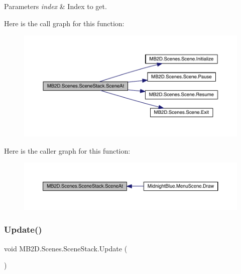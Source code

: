 \begin{DoxyParams}{Parameters}
{\em index} & Index to get.\\
\hline
\end{DoxyParams}
Here is the call graph for this function\+:\nopagebreak
\begin{figure}[H]
\begin{center}
\leavevmode
\includegraphics[width=350pt]{class_m_b2_d_1_1_scenes_1_1_scene_stack_a84b1a5b2771f6c663eece04bcafd5416_cgraph}
\end{center}
\end{figure}
Here is the caller graph for this function\+:\nopagebreak
\begin{figure}[H]
\begin{center}
\leavevmode
\includegraphics[width=350pt]{class_m_b2_d_1_1_scenes_1_1_scene_stack_a84b1a5b2771f6c663eece04bcafd5416_icgraph}
\end{center}
\end{figure}
\hypertarget{class_m_b2_d_1_1_scenes_1_1_scene_stack_a8486b29eb65458e88512989201772984}{}\label{class_m_b2_d_1_1_scenes_1_1_scene_stack_a8486b29eb65458e88512989201772984} 
\subsubsection{\texorpdfstring{Update()}{Update()}}
{\footnotesize\ttfamily void M\+B2\+D.\+Scenes.\+Scene\+Stack.\+Update (\begin{DoxyParamCaption}{ }\end{DoxyParamCaption})\hspace{0.3cm}{\ttfamily [inline]}}



